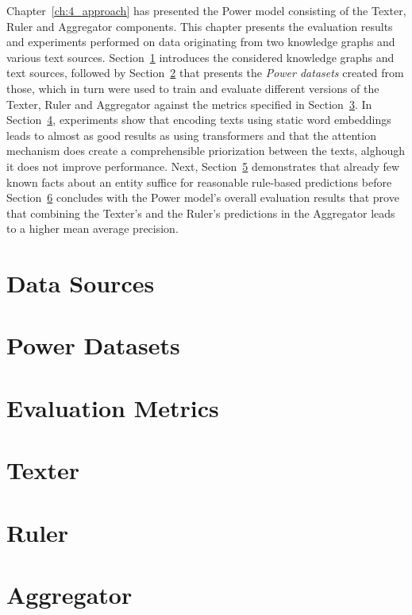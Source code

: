 Chapter~\ref{ch:4_approach} has presented the Power model consisting of the Texter, Ruler and Aggregator components. This chapter presents the evaluation results and experiments performed on data originating from two knowledge graphs and various text sources. Section~\ref{sec:5_experiments/1_data_sources} introduces the considered knowledge graphs and text sources, followed by Section~\ref{sec:5_experiments/2_power_datasets} that presents the \emph{Power datasets} created from those, which in turn were used to train and evaluate different versions of the Texter, Ruler and Aggregator against the metrics specified in Section~\ref{sec:5_experiments/3_metrics}. In Section~\ref{sec:5_experiments/4_texter}, experiments show that encoding texts using static word embeddings leads to almost as good results as using transformers and that the attention mechanism does create a comprehensible priorization between the texts, alghough it does not improve performance. Next, Section~\ref{sec:5_experiments/5_ruler} demonstrates that already few known facts about an entity suffice for reasonable rule-based predictions before Section~\ref{sec:5_experiments/6_aggregator} concludes with the Power model's overall evaluation results that prove that combining the Texter's and the Ruler's predictions in the Aggregator leads to a higher mean average precision.


\section{Data Sources}
\label{sec:5_experiments/1_data_sources}



\section{Power Datasets}
\label{sec:5_experiments/2_power_datasets}



\section{Evaluation Metrics}
\label{sec:5_experiments/3_metrics}



\section{Texter}
\label{sec:5_experiments/4_texter}



\section{Ruler}
\label{sec:5_experiments/5_ruler}



\section{Aggregator}
\label{sec:5_experiments/6_aggregator}

